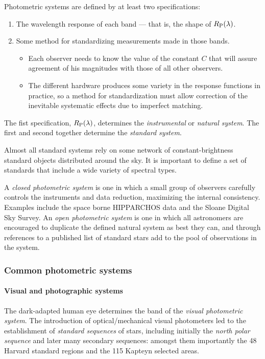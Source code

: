 Photometric systems are defined by at least two specifications:
\begin{enumerate}
\item The wavelength response of each band --- that is, the shape of
  $R_{\rm P}(\lambda)$.
\item Some method for standardizing measurements made in those bands. 
\begin{itemize}
\item Each observer needs to know the value of the constant $C$ that
  will assure agreement of his magnitudes with those of all other
  observers.
\item The different hardware produces some variety in the response
  functions in practice, so a method for standardization must allow
  correction of the inevitable systematic effects due to imperfect matching.
\end{itemize}
\end{enumerate}

The fist specification, $R_{\rm P}(\lambda)$, determines the
{\it instrumental} or {\it natural system}. The first and second
together determine the {\it standard system}. 

Almost all standard systems rely on some network of
constant-brightness standard objects distributed around the sky. It is
important to define a set of standards that include a wide variety of
spectral types.

A {\it closed photometric system} is one in which a small group of
observers carefully controls the instruments and data reduction,
maximizing the internal consistency. Examples include the space borne
HIPPARCHOS data and the Sloane Digital Sky Survey. An {\it open
  photometric system}  is one in which all astronomers are encouraged
to duplicate the defined natural system as best they can, and through
references to a published list of standard stars add to the pool of
observations in the system.

\subsubsection{Common photometric systems}

\paragraph{Visual and photographic systems} The dark-adapted human eye
determines the band of the {\it visual photometric system}. The
introduction of optical/mechanical visual photometers led to the
establishment of {\it standard sequences} of stars, including
initially the {\it north polar sequence} and later many secondary
sequences: amongst them importantly the 48 Harvard standard regions and the 115 Kapteyn
selected areas.

